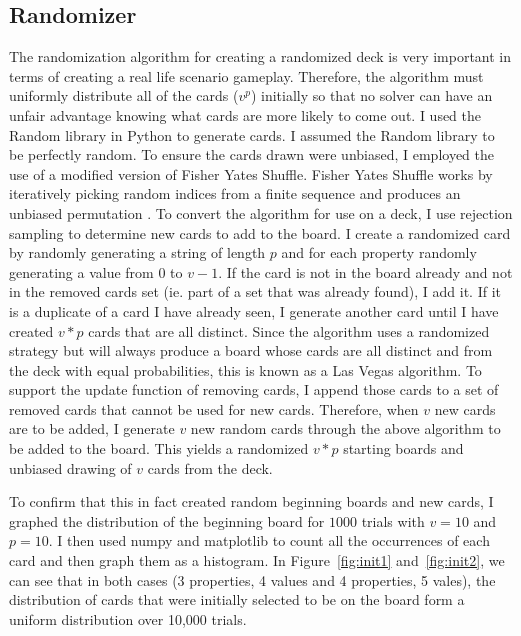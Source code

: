 \documentclass[pageno]{jpaper}
\begin{document}
\subsection{Randomizer}

The randomization algorithm for creating a randomized deck is very important in terms of creating a real life scenario gameplay. Therefore, the algorithm must uniformly distribute all of the cards ($v^p$) initially so that no solver can have an unfair advantage knowing what cards are more likely to come out. I used the Random library in Python to generate cards. I assumed the Random library to be perfectly random. To ensure the cards drawn were unbiased, I employed the use of a modified version of Fisher Yates Shuffle. Fisher Yates Shuffle works by iteratively picking random indices from a finite sequence and produces an unbiased permutation \cite{fisher}. To convert the algorithm for use on a deck, I use rejection sampling to determine new cards to add to the board. I create a randomized card by randomly generating a string of length $p$ and for each property randomly generating a value from $0$ to $v-1$. If the card is not in the board already and not in the removed cards set (ie. part of a set that was already found), I add it. If it is a duplicate of a card I have already seen, I generate another card until I have created $v*p$ cards that are all distinct. Since the algorithm uses a randomized strategy but will always produce a board whose cards are all distinct and from the deck with equal probabilities, this is known as a Las Vegas algorithm. To support the update function of removing cards, I append those cards to a set of removed cards that cannot be used for new cards. Therefore, when $v$ new cards are to be added, I generate $v$ new random cards through the above algorithm to be added to the board. This yields a randomized $v*p$ starting boards and unbiased drawing of $v$ cards from the deck.

To confirm that this in fact created random beginning boards and new cards, I graphed the distribution of the beginning board for $1000$ trials with $v = 10$ and $p = 10$. I then used numpy and matplotlib to count all the occurrences of each card and then graph them as a histogram. In Figure~\ref{fig:init1}  and~\ref{fig:init2}, we can see that in both cases (3 properties, 4 values and 4 properties, 5 vales), the distribution of cards that were initially selected to be on the board form a uniform distribution over 10,000 trials.
\end{document}
